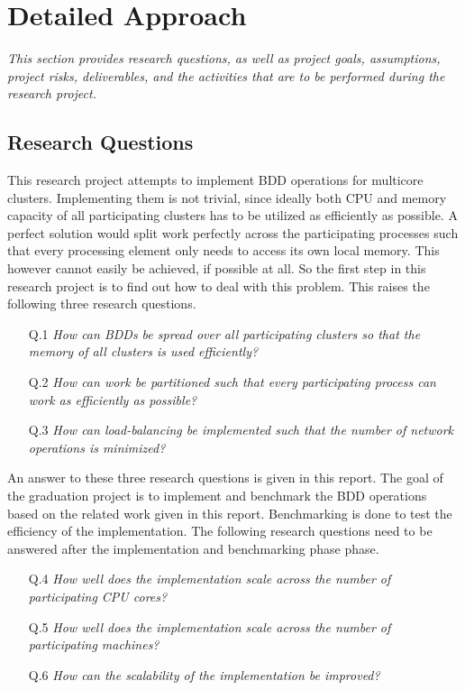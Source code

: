 \chapter{Detailed Approach}

\textit{This section provides research questions, as well as project goals, assumptions, project risks, deliverables, and the activities that are to be performed during the research project.}

\section{Research Questions}
This research project attempts to implement BDD operations for multicore clusters. Implementing them is not trivial, since ideally both CPU and memory capacity of all participating clusters has to be utilized as efficiently as possible. A perfect solution would split work perfectly across the participating processes such that every processing element only needs to access its own local memory. This however cannot easily be achieved, if possible at all. So the first step in this research project is to find out how to deal with this problem. This raises the following three research questions.

\begin{enumerate}
	\item[Q.1]{\textit{How can BDDs be spread over all participating clusters so that the memory of all clusters is used efficiently?}}
	\item[Q.2]{\textit{How can work be partitioned such that every participating process can work as efficiently as possible?}}
	\item[Q.3]{\textit{How can load-balancing be implemented such that the number of network operations is minimized?}}
\end{enumerate}

An answer to these three research questions is given in this report. The goal of the graduation project is to implement and benchmark the BDD operations based on the related work given in this report. Benchmarking is done to test the efficiency of the implementation. The following research questions need to be answered after the implementation and benchmarking phase phase.

\begin{enumerate}
	\item[Q.4]{\textit{How well does the implementation scale across the number of participating CPU cores?}}
	\item[Q.5]{\textit{How well does the implementation scale across the number of participating machines?}}
	\item[Q.6]{\textit{How can the scalability of the implementation be improved?}}
\end{enumerate}

